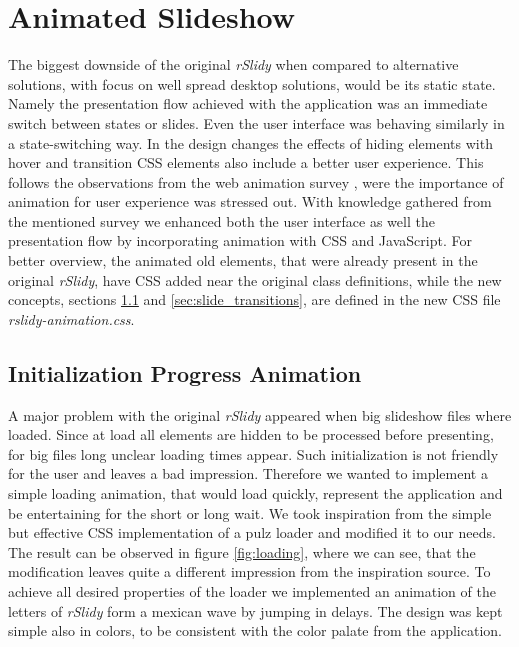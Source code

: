 %
%
% 
% 
% 


\chapter{Animated Slideshow}

\label{chap:animated}

The biggest downside of the original \textit{rSlidy} when compared to alternative solutions, with focus on well spread desktop solutions, would be its static state. Namely the presentation flow achieved with the application was an immediate switch between states or slides. Even the user interface was behaving similarly in a state-switching way. In the design changes the effects of hiding elements with hover and transition CSS elements also include a better user experience. This follows the observations from the web animation survey \citet{WebAnime}, were the importance of animation for user experience was stressed out. With knowledge gathered from the mentioned survey we enhanced both the user interface as well the presentation flow by incorporating animation with CSS and JavaScript. For better overview, the animated old elements, that were already present in the original \textit{rSlidy}, have CSS added near the original class definitions, while the new concepts, sections \ref{sec:initialization} and \ref{sec:slide_transitions}, are defined in the new CSS file \textit{rslidy-animation.css}.

\section{Initialization Progress Animation} %
\label{sec:initialization}

A major problem with the original \textit{rSlidy} appeared when big slideshow files where loaded. Since at load all elements are hidden to be processed before presenting, for big files long unclear loading times appear. Such initialization is not friendly for the user and leaves a bad impression. Therefore we wanted to implement a simple loading animation, that would load quickly, represent the application and be entertaining for the short or long wait. We took inspiration from the simple but effective CSS implementation of a pulz loader\citep{WebAnime} and modified it to our needs. The result can be observed in figure \ref{fig:loading}, where we can see, that the modification leaves quite a different impression from the inspiration source. To achieve all desired properties of the loader we implemented an animation of the letters of \textit{rSlidy} form a mexican wave by jumping in delays. The design was kept simple also in colors, to be consistent with the color palate from the application.

